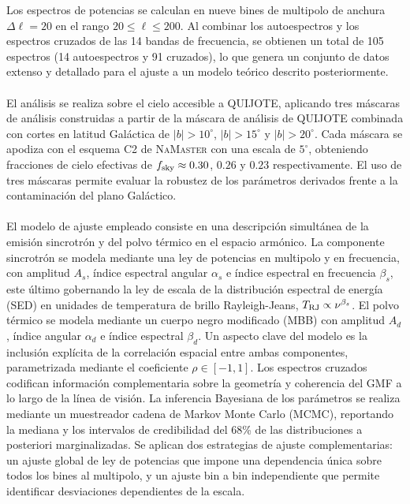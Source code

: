 Los espectros de potencias se calculan en nueve bines de multipolo de anchura $\Delta\ell = 20$ en el rango $20 \leq \ell \leq 200$. Al combinar los autoespectros y los espectros cruzados de las 14 bandas de frecuencia, se obtienen un total de 105 espectros (14 autoespectros y 91 cruzados), lo que genera un conjunto de datos extenso y detallado para el ajuste a un modelo teórico descrito posteriormente.

\paragraph{}

El análisis se realiza sobre el cielo accesible a QUIJOTE, aplicando tres máscaras de análisis construidas a partir de la máscara de análisis de QUIJOTE combinada con cortes en latitud Galáctica de $|b| > 10^\circ$, $|b| > 15^\circ$ y $|b| > 20^\circ$. Cada máscara se apodiza con el esquema C2 de \textsc{NaMaster} con una escala de $5^\circ$, obteniendo fracciones de cielo efectivas de $f_{\rm sky} \approx 0.30$, $0.26$ y $0.23$ respectivamente. El uso de tres máscaras permite evaluar la robustez de los parámetros derivados frente a la contaminación del plano Galáctico.

\paragraph{}

El modelo de ajuste empleado consiste en una descripción simultánea de la emisión sincrotrón y del polvo térmico en el espacio armónico. La componente sincrotrón se modela mediante una ley de potencias en multipolo y en frecuencia, con amplitud $A_s$, índice espectral angular $\alpha_s$ e índice espectral en frecuencia $\beta_s$, este último gobernando la ley de escala de la distribución espectral de energía (SED) en unidades de temperatura de brillo Rayleigh-Jeans, $T_{\rm RJ} \propto \nu^{\beta_s}$. El polvo térmico se modela mediante un cuerpo negro modificado (MBB) con amplitud $A_d$, índice angular $\alpha_d$ e índice espectral $\beta_d$. Un aspecto clave del modelo es la inclusión explícita de la correlación espacial entre ambas componentes, parametrizada mediante el coeficiente $\rho \in [-1,1]$. Los espectros cruzados codifican información complementaria sobre la geometría y coherencia del GMF a lo largo de la línea de visión. La inferencia Bayesiana de los parámetros se realiza mediante un muestreador cadena de Markov Monte Carlo (MCMC), reportando la mediana y los intervalos de credibilidad del 68\% de las distribuciones a posteriori marginalizadas. Se aplican dos estrategias de ajuste complementarias: un ajuste global de ley de potencias que impone una dependencia única sobre todos los bines al multipolo, y un ajuste bin a bin independiente que permite identificar desviaciones dependientes de la escala.

